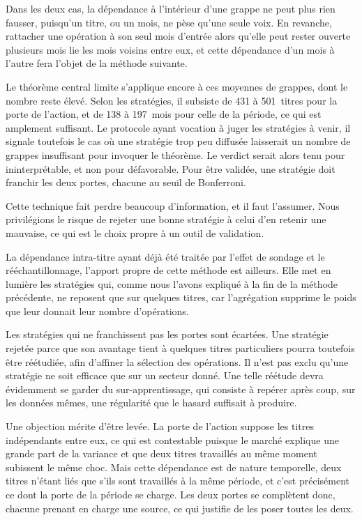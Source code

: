 Dans les deux cas, la dépendance à l'intérieur d'une grappe ne peut plus rien
fausser, puisqu'un titre, ou un mois, ne pèse qu'une seule voix. En revanche,
rattacher une opération à son seul mois d'entrée alors qu'elle peut rester
ouverte plusieurs mois lie les mois voisins entre eux, et cette dépendance
d'un mois à l'autre fera l'objet de la méthode suivante.

Le théorème central limite s'applique encore à ces moyennes de grappes, dont
le nombre reste élevé. Selon les stratégies, il subsiste de 431 à 501~titres
pour la porte de l'action, et de 138 à 197~mois pour celle de la période, ce
qui est amplement suffisant. Le protocole ayant vocation à juger les
stratégies à venir, il signale toutefois le cas où une stratégie trop peu
diffusée laisserait un nombre de grappes insuffisant pour invoquer le
théorème. Le verdict serait alors tenu pour ininterprétable, et non pour
défavorable. Pour être validée, une stratégie doit franchir les deux portes,
chacune au seuil de Bonferroni.

Cette technique fait perdre beaucoup d'information, et il faut l'assumer. Nous
privilégions le risque de rejeter une bonne stratégie à celui d'en retenir une
mauvaise, ce qui est le choix propre à un outil de validation.

La dépendance intra-titre ayant déjà été traitée par l'effet de sondage et le
rééchantillonnage, l'apport propre de cette méthode est ailleurs. Elle met en
lumière les stratégies qui, comme nous l'avons expliqué à la fin de la méthode
précédente, ne reposent que sur quelques titres, car l'agrégation supprime le
poids que leur donnait leur nombre d'opérations.

Les stratégies qui ne franchissent pas les portes sont écartées. Une stratégie
rejetée parce que son avantage tient à quelques titres particuliers pourra
toutefois être réétudiée, afin d'affiner la sélection des opérations. Il n'est
pas exclu qu'une stratégie ne soit efficace que sur un secteur donné. Une
telle réétude devra évidemment se garder du sur-apprentissage, qui consiste à
repérer après coup, sur les données mêmes, une régularité que le hasard
suffisait à produire.

Une objection mérite d'être levée. La porte de l'action suppose les titres
indépendants entre eux, ce qui est contestable puisque le marché explique une
grande part de la variance et que deux titres travaillés au même moment
subissent le même choc. Mais cette dépendance est de nature temporelle, deux
titres n'étant liés que s'ils sont travaillés à la même période, et c'est
précisément ce dont la porte de la période se charge. Les deux portes se
complètent donc, chacune prenant en charge une source, ce qui justifie de les
poser toutes les deux.

